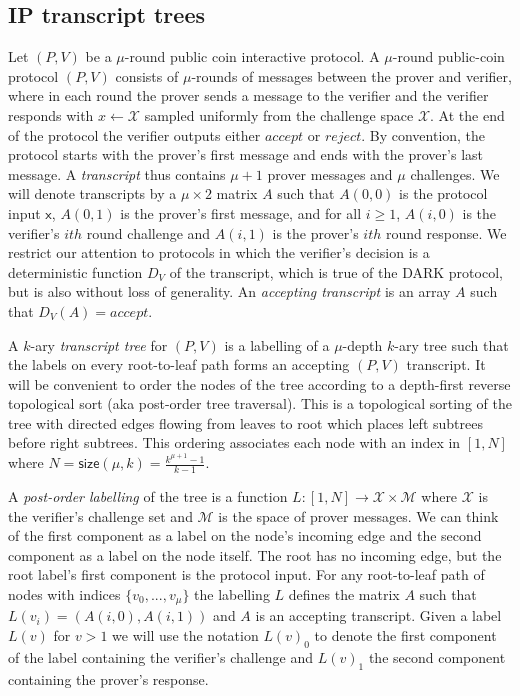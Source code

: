 \subsection{IP transcript trees} 

Let $(P,V)$ be a $\mu$-round public coin interactive protocol. A $\mu$-round public-coin protocol $(P,V)$ consists of $\mu$-rounds of messages between the prover and verifier, where in each round the prover sends a message to the verifier and the verifier responds with $x \leftarrow \mathcal{X}$ sampled uniformly from the challenge space $\mathcal{X}$. At the end of the protocol the verifier outputs either $accept$ or $reject$. By convention, the protocol starts with the prover's first message and ends with the prover's last message. A \emph{transcript} thus contains $\mu+1$ prover messages and $\mu$ challenges. We will denote transcripts by a $\mu \times 2$ matrix $A$ such that $A(0,0)$ is the protocol input $\mathsf{x}$, $A(0, 1)$ is the prover's first message, and for all $i ≥ 1$, $A(i, 0)$ is the verifier's $ith$ round challenge and $A(i,1)$ is the prover's $ith$ round response.  We restrict our attention to protocols in which the verifier's decision is a deterministic function $D_V$ of the transcript, which is true of the DARK protocol, but is also without loss of generality. An \emph{accepting transcript} is an array $A$ such that $D_V(A) = accept$. 

A $k$-ary \emph{transcript tree} for $(P,V)$ is a labelling of a $\mu$-depth $k$-ary tree such that the labels on every root-to-leaf path forms an accepting $(P,V)$ transcript. It will be convenient to order the nodes of the tree according to a depth-first reverse topological sort (aka post-order tree traversal). This is a topological sorting of the tree with directed edges flowing from leaves to root which places left subtrees before right subtrees. This ordering associates each node with an index in $[1,N]$ where $N = \textsf{size}(\mu, k) = \frac{k^{\mu+1} - 1}{k-1}$.

A \emph{post-order labelling} of the tree is a function $L:[1,N] \rightarrow \mathcal{X} \times \mathcal{M}$ where $\mathcal{X}$ is the verifier's challenge set and $\mathcal{M}$ is the space of prover messages. We can think of the first component as a label on the node's incoming edge and the second component as a label on the node itself. The root has no incoming edge, but the root label's first component is the protocol input. For any root-to-leaf path of nodes with indices $\{v_0,...,v_\mu\}$ the labelling $L$ defines the matrix $A$ such that $L(v_i) = (A(i, 0), A(i, 1))$ and $A$ is an accepting transcript. Given a label $L(v)$ for $v > 1$ we will use the notation $L(v)_0$ to denote the first component of the label containing the verifier's challenge and $L(v)_1$ the second component containing the prover's response.

